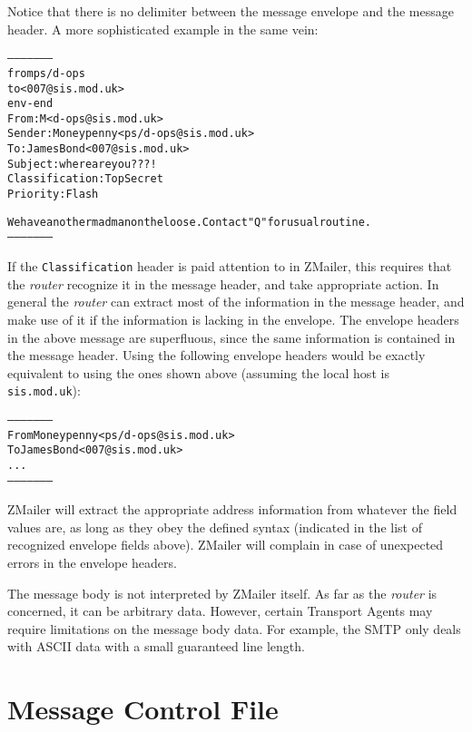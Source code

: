 Notice that there is no delimiter between the message envelope and the
message header.  A more sophisticated example in the same vein:

\begin{alltt}
     --------------------
     from ps/d-ops
     to <007@sis.mod.uk>
     env-end
     From: M <d-ops@sis.mod.uk>
     Sender: Moneypenny <ps/d-ops@sis.mod.uk>
     To: James Bond <007@sis.mod.uk>
     Subject: where are you???!
     Classification: Top Secret
     Priority: Flash
     
     We have another madman on the loose.  Contact "Q" for usual routine.
     --------------------
\end{alltt}


If the {\tt Classification} header is paid attention to in ZMailer, this
requires that the {\em router} recognize it in the message header, and take
appropriate action.  In general the {\em router} can extract most of the
information in the message header, and make use of it if the information is
lacking in the envelope.  The envelope headers in the above message are
superfluous, since the same information is contained in the message header.
Using the following envelope headers would be exactly equivalent to using
the ones shown above (assuming the local host is {\tt sis.mod.uk}):

\begin{alltt}
     --------------------
     From Moneypenny <ps/d-ops@sis.mod.uk>
     To James Bond <007@sis.mod.uk>
     ...
     --------------------
\end{alltt}


ZMailer will extract the appropriate address information from whatever the
field values are, as long as they obey the defined syntax (indicated in the
list of recognized envelope fields above).  ZMailer will complain in case
of unexpected errors in the envelope headers.

The message body is not interpreted by ZMailer itself.  As far as the
{\em router} is concerned, it can be arbitrary data.  However, certain Transport
Agents may require limitations on the message body data. For example, the
SMTP only deals with ASCII data with a small guaranteed line length.










\section{Message Control File}

